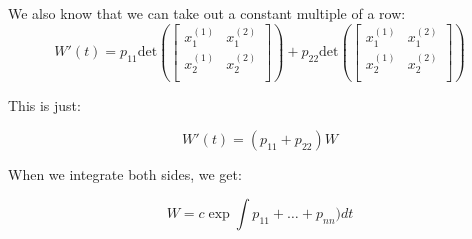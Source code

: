 \documentclass{report}
\begin{document}
We also know that we can take out a constant multiple of a row:
$$
W'(t) =
p_{11}
\text{det}\left(
\begin{bmatrix}
    x_1^{(1)} & x_1^{(2)} \\
    x_2^{(1)} & x_2^{(2)} \\
\end{bmatrix}\right)
+
p_{22}
\text{det}\left(
\begin{bmatrix}
    x_1^{(1)} & x_1^{(2)} \\
    x_2^{(1)} &  x_2^{(2)} \\
\end{bmatrix}\right)
$$

This is just:

$$W'(t) = (p_{11} + p_{22})W$$

When we integrate both sides, we get:

$$W = c\exp{\int{p_{11} + \dots + p_{nn})dt}}$$
\end{document}
